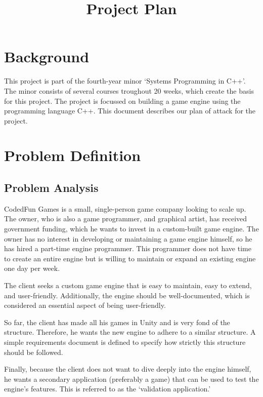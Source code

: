 \documentclass{projdoc}
\title{Project Plan}
\begin{document}
\tablestables
\newpage


\section {Background}
This project is part of the fourth-year minor `Systems Programming in C++'. The minor consists of several courses troughout 20 weeks, which create the basis for this project. The project is focussed on building a game engine using the programming language C++. This document describes our plan of attack for the project.

\section{Problem Definition}

\subsection{Problem Analysis}
CodedFun Games is a small, single-person game company looking to scale up. The owner, who is also a game programmer, and graphical artist, has received government funding, which he wants to invest in a custom-built game engine. The owner has no interest in developing or maintaining a game engine himself, so he has hired a part-time engine programmer. This programmer does not have time to create an entire engine but is willing to maintain or expand an existing engine one day per week.

The client seeks a custom game engine that is easy to maintain, easy to extend, and user-friendly. Additionally, the engine should be well-documented, which is considered an essential aspect of being user-friendly.

So far, the client has made all his games in Unity and is very fond of the structure. Therefore, he wants the new engine to adhere to a similar structure. A simple requirements document is defined to specify how strictly this structure should be followed.

Finally, because the client does not want to dive deeply into the engine himself, he wants a secondary application (preferably a game) that can be used to test the engine's features. This is referred to as the `validation application.'
\end{document}
